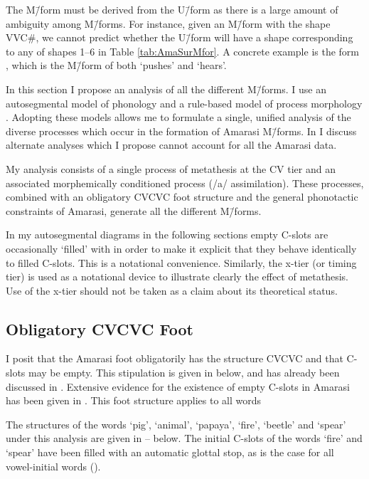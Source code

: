 The M\=/form must be derived from the U\=/form
as there is a large amount of ambiguity among M\=/forms.
For instance, given an M\=/form with the shape VVC{\#},
we cannot predict whether the U\=/form will have a shape
corresponding to any of shapes 1--6 in Table \ref{tab:AmaSurMfor}.
A concrete example is the form ,
which is the M\=/form of both
 `pushes' and  `hears'.

In this section I propose an analysis of all the different M\=/forms.
I use an autosegmental model of phonology \citep{go76}
and a rule-based model of process morphology \citep{ma74,an92}.
Adopting these models allows me to formulate a single, unified
analysis of the diverse processes which occur in the formation of Amarasi M\=/forms.
In  I discuss alternate analyses
which I propose cannot account for all the Amarasi data.

My analysis consists of a single process of metathesis at the CV tier
and an associated morphemically conditioned process (/a/ assimilation).
These processes, combined with an obligatory CVCVC foot structure
and the general phonotactic constraints of Amarasi,
generate all the different M\=/forms.

In my autosegmental diagrams in the following sections
empty C-slots are occasionally `filled' with {\0}
in order to make it explicit that they behave identically to filled C-slots.
This is a notational convenience.
Similarly, the x-tier (or timing tier) is used as a notational device to
illustrate clearly the effect of metathesis.
Use of the x-tier should not be taken as a claim about its theoretical status.

\subsection{Obligatory CVCVC Foot}\label{sec:ThePhoRul}
I posit that the Amarasi foot obligatorily has the structure CVCVC
and that C-slots may be empty.
This stipulation is given in  below,
and has already been discussed in .
Extensive evidence for the existence
of empty C-slots in Amarasi has been given in .
This foot structure applies to all words

\begin{exe}
	\label{ex2:Ft->CVCVC}
\end{exe}

The structures of the words  `pig',  `animal',  `papaya',
 `fire',  `beetle' and  `spear' under this analysis
are given in -- below.
The initial C-slots of the words  `fire' and  `spear'
have been filled with an automatic glottal stop,
as is the case for all vowel-initial words ().

